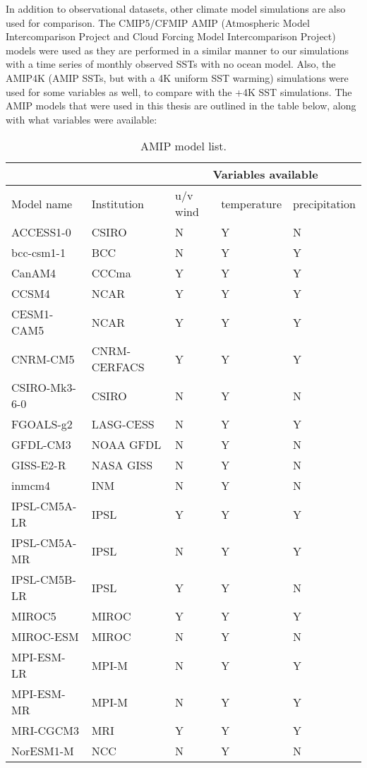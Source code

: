 \documentclass[letterpaper,12pt,titlepage,oneside,final]{book}
\begin{document}
In addition to observational datasets, other climate model simulations are also used for comparison. The CMIP5/CFMIP AMIP (Atmospheric Model Intercomparison Project and Cloud Forcing Model Intercomparison Project) \citep{bony_cfmip:_2011} models were used as they are performed in a similar manner to our simulations with a time series of monthly observed SSTs with no ocean model. Also, the AMIP4K (AMIP SSTs, but with a 4K uniform SST warming) simulations were used for some variables as well, to compare with the +4K SST simulations. The AMIP models that were used in this thesis are outlined in the table below, along with what variables were available:

\begin{table}[H]
\caption{AMIP model list.}
\label{tab:amip}
\begin{tabular}{|p{4cm}||p{3.5cm}|p{2cm}|p{2.25cm}|p{2.25cm}|}
\hline
&&\multicolumn{3}{|c|}{Variables available}\\
\hline
Model name&Institution&u/v wind&temperature&precipitation\\ \hline
ACCESS1-0&CSIRO&N&Y&N\\   \hline
bcc-csm1-1&BCC&N&Y&Y\\ \hline
CanAM4&CCCma&Y&Y&Y\\ \hline
CCSM4&NCAR&Y&Y&Y\\ \hline
CESM1-CAM5&NCAR&Y&Y&Y\\ \hline
CNRM-CM5&CNRM-CERFACS&Y&Y&Y\\ \hline
CSIRO-Mk3-6-0&CSIRO&N&Y&N\\ \hline
FGOALS-g2&LASG-CESS&N&Y&Y\\ \hline
GFDL-CM3&NOAA GFDL&N&Y&N\\ \hline
GISS-E2-R&NASA GISS&N&Y&N\\ \hline
inmcm4&INM&N&Y&N\\ \hline
IPSL-CM5A-LR&IPSL&Y&Y&Y\\ \hline
IPSL-CM5A-MR&IPSL&N&Y&Y\\ \hline
IPSL-CM5B-LR&IPSL&Y&Y&N\\ \hline
MIROC5&MIROC&Y&Y&Y\\ \hline
MIROC-ESM&MIROC&N&Y&N\\ \hline
MPI-ESM-LR&MPI-M&N&Y&Y\\ \hline
MPI-ESM-MR&MPI-M&N&Y&Y\\ \hline
MRI-CGCM3&MRI&Y&Y&Y\\ \hline
NorESM1-M&NCC&N&Y&N\\ \hline

\end{tabular}
\end{table}
\end{document}
